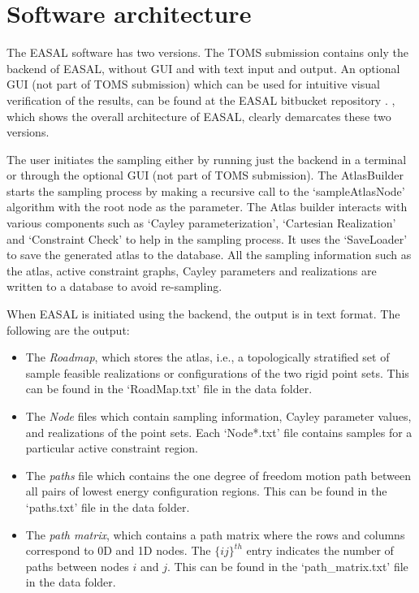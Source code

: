 \section{Software architecture}
\label{architecture}

The EASAL software has two versions. The TOMS submission contains only the
backend of EASAL, without GUI and with text input and output.  An optional GUI
(not part of TOMS submission) which can be used for intuitive visual
verification of the results, can be found at the EASAL bitbucket repository
\cite{easalSoftware}. , which shows the overall
architecture of EASAL, clearly demarcates these two versions.

The user initiates the sampling either by running just the backend in a
terminal or through the optional GUI (not part of TOMS submission). The
AtlasBuilder starts the sampling process by making a recursive call to the
`sampleAtlasNode' algorithm with the root node as the parameter. The Atlas
builder interacts with various components such as `Cayley parameterization',
`Cartesian Realization' and `Constraint Check' to help in the sampling process.
It uses the `SaveLoader' to save the generated atlas to the database.  All the
sampling information such as the atlas, active constraint graphs, Cayley
parameters and realizations are written to a database to avoid re-sampling.

When EASAL is initiated using the backend, the output is in text format.
The following are the output:
\begin{itemize}
\item The \emph{Roadmap}, which stores the atlas, i.e., a topologically
stratified set of sample feasible realizations or configurations of the two
rigid point sets. This can be found in the `RoadMap.txt' file in the data
folder.

\item The \emph{Node} files which contain sampling information, Cayley
parameter values, and realizations of the point sets. Each `Node*.txt' file
contains samples for a particular active constraint region.

\item The \emph{paths} file which contains the one degree of freedom motion
path between all pairs of lowest energy configuration regions. This can be
found in the `paths.txt' file in the data folder.

\item The \emph{path matrix}, which contains a path matrix where the rows and
columns correspond to 0D and 1D nodes. The $\{ij\}^{th}$ entry indicates the
number of paths between nodes $i$ and $j$. This can be found in the
`path\_matrix.txt' file in the data folder.
\end{itemize}

